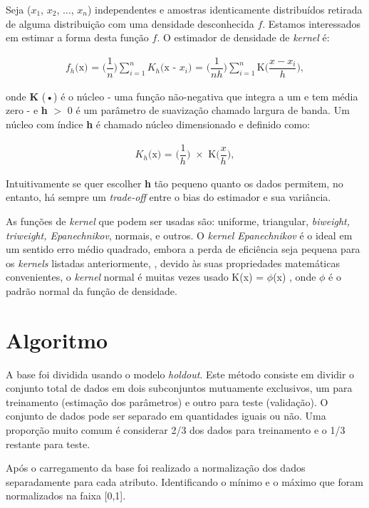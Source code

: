 \documentclass[preprint,12pt]{elsarticle}
\begin{document}
Seja ($x_1$, $x_2$, $\dots$, $x_n$) independentes e amostras identicamente distribuídos retirada de alguma distribuição com uma densidade desconhecida $f$. Estamos interessados em estimar a forma desta função $f$. O estimador de densidade de \textit{kernel} é:

\begin{align}
\text {$f _h$(x) = ($\dfrac{1}{n}$)$\sum_{i=1}^{n}$$K_h$(x - $x_i$) = ($\dfrac{1}{nh}$)$\sum_{i=1}^{n}$K($\dfrac{x - x_i}{h}$)},
\end{align}

onde \textbf{K} (•) é o núcleo - uma função não-negativa que integra a um e tem média zero - e \textbf{h} $>$ 0 é um parâmetro de suavização chamado largura de banda. Um núcleo com índice \textbf{h} é chamado núcleo dimensionado e definido como:

\begin{align}
\text {$K_h$(x) = ($\dfrac{1}{h}$)  $\times$  K($\dfrac{x}{h}$)},
\end{align}

Intuitivamente se quer escolher \textbf{h} tão pequeno quanto os dados permitem, no entanto, há sempre um \textit{trade-off} entre o bias do estimador e sua variância.

As funções de \textit{kernel} que podem ser usadas são: uniforme, triangular,\textit{ biweight, triweight, Epanechnikov}, normais, e outros. O \textit{kernel Epanechnikov} é o ideal em um sentido erro médio quadrado, \citep{Epanechnikov1969} embora a perda de eficiência seja pequena para os \textit{kernels} listadas anteriormente, \citep{Wand1995}, devido às suas propriedades matemáticas convenientes, o \textit{kernel} normal é muitas vezes usado K(x) = $\phi$(x) , onde $\phi$ é o padrão normal da função de densidade.

\section{Algoritmo}

A base foi dividida usando o modelo \textit{holdout}. Este método consiste em dividir o conjunto total de dados em dois subconjuntos mutuamente exclusivos, um para treinamento (estimação dos parâmetros) e outro para teste (validação). O conjunto de dados pode ser separado em quantidades iguais ou não. Uma proporção muito comum é considerar 2/3 dos dados para treinamento e o 1/3 restante para teste. \citep{Kohavi1995}

Após o carregamento da base foi realizado a normalização dos dados separadamente para cada atributo. Identificando o mínimo e o máximo que foram normalizados na faixa [0,1].
\end{document}
